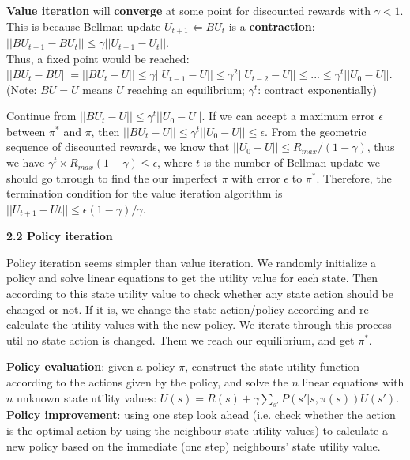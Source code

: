 \documentclass[12pt]{article}
\begin{document}
\begin{tcolorbox}

\textbf{Value iteration} will \textbf{converge} at some point for discounted rewards with $\gamma < 1$. This is because Bellman update $U_{t+1} \Leftarrow BU_{t}$ is a \textbf{contraction}: $||BU_{t+1} - BU_{t}|| \leq \gamma||U_{t+1} - U_{t}||$. \\

Thus, a fixed point would be reached: $||BU_{t} - BU||  = ||BU_{t} - U|| \leq \gamma ||U_{t-1} - U|| \leq  \gamma^2 ||U_{t-2} - U||  \leq ...  \leq \gamma^t ||U_{0} - U||$. (Note: $BU = U$ means $U$ reaching an equilibrium; $\gamma^t$: contract exponentially)

\end{tcolorbox}

\begin{tcolorbox}
Continue from $||BU_{t} - U||  \leq \gamma^t ||U_{0} - U||$. If we can accept a maximum error $\epsilon$ between $\pi^*$ and $\pi$, then $||BU_{t} - U||  \leq \gamma^t ||U_{0} - U|| \leq \epsilon $. From the geometric sequence of discounted rewards, we know that $||U_{0} - U|| \leq R_{max}/(1- \gamma)$, thus we have $\gamma^t \times R_{max}(1- \gamma) \leq \epsilon$, where $t$ is the number of Bellman update we should go through to find the our imperfect $\pi$ with error $\epsilon$ to $\pi^*$. Therefore, the termination condition for the value iteration algorithm is $||U_{t+1} - U{t}|| \leq \epsilon(1 - \gamma)/ \gamma$.
\end{tcolorbox}


\textbf{2.2 Policy iteration}

Policy iteration seems simpler than value iteration. We randomly initialize a policy and solve linear equations to get the utility value for each state. Then according to this state utility value to check whether any state action should be changed or not. If it is, we change the state action/policy according and re-calculate the utility values with the new policy. We iterate through this process util no state action is changed. Them we reach our equilibrium, and get $\pi^*$. \\

\begin{tcolorbox}
\textbf{Policy evaluation}: given a policy $\pi$, construct the state utility function according to the actions given by the policy, and solve the $n$ linear equations with $n$ unknown state utility values: 
$U(s) = R(s) +  \gamma \sum_{s'}^{} P(s' | s, \pi(s)) U(s')$.\\

\textbf{Policy improvement}: using one step look ahead (i.e. check whether the action is the optimal action by using the neighbour state utility values) to calculate a new policy based on the immediate (one step) neighbours' state utility value.
\end{tcolorbox}
\end{document}
